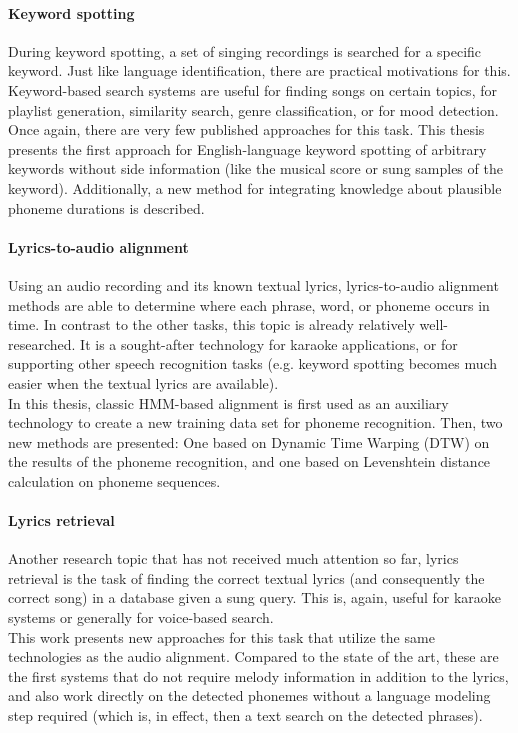 \paragraph{Keyword spotting}
During keyword spotting, a set of singing recordings is searched for a specific keyword. Just like language identification, there are practical motivations for this. Keyword-based search systems are useful for finding songs on certain topics, for playlist generation, similarity search, genre classification, or for mood detection.\\
Once again, there are very few published approaches for this task. This thesis presents the first approach for English-language keyword spotting of arbitrary keywords without side information (like the musical score or sung samples of the keyword). Additionally, a new method for integrating knowledge about plausible phoneme durations is described.

\paragraph{Lyrics-to-audio alignment}
Using an audio recording and its known textual lyrics, lyrics-to-audio alignment methods are able to determine where each phrase, word, or phoneme occurs in time. In contrast to the other tasks, this topic is already relatively well-researched. It is a sought-after technology for karaoke applications, or for supporting other speech recognition tasks (e.g. keyword spotting becomes much easier when the textual lyrics are available).\\
In this thesis, classic HMM-based alignment is first used as an auxiliary technology to create a new training data set for phoneme recognition. Then, two new methods are presented: One based on Dynamic Time Warping (DTW) on the results of the phoneme recognition, and one based on Levenshtein distance calculation on phoneme sequences.

\paragraph{Lyrics retrieval}
Another research topic that has not received much attention so far, lyrics retrieval is the task of finding the correct textual lyrics (and consequently the correct song) in a database given a sung query. This is, again, useful for karaoke systems or generally for voice-based search.\\
This work presents new approaches for this task that utilize the same technologies as the audio alignment. Compared to the state of the art, these are the first systems that do not require melody information in addition to the lyrics, and also work directly on the detected phonemes without a language modeling step required (which is, in effect, then a text search on the detected phrases).

